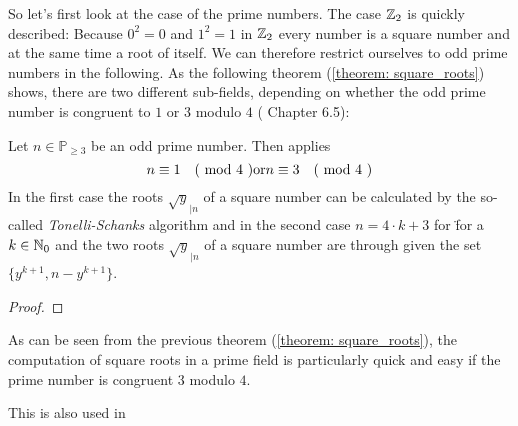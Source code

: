 So let's first look at the case of the prime numbers. The case $ \mathbb{Z}_2 $ is quickly described: Because $ 0^2 = 0 $ and
$ 1 ^ 2 = 1 $ in $ \mathbb{Z}_2 $ every number is a square number and at the same time a root of itself. We can therefore restrict ourselves to odd prime numbers in the following. As the following theorem (\ref{theorem: square_roots}) shows, there are two different sub-fields, depending on whether the odd prime number is congruent to $ 1 $ or $ 3 $ modulo $ 4 $ (\cite{HW} Chapter 6.5):
\begin{theorem} 
\label{theorem: square_roots}
Let $ n \in \mathbb{P}_{\geq 3} $ be an odd prime number. Then applies
$$ n \equiv 1 \quad \text{( mod } 4 \text{ )} \text{or} n \equiv 3 \quad \text{( mod } 4 \text{ )} $$
In the first case the roots $ \sqrt{y}_{| n} $ of a square number can be calculated by the so-called \textit{Tonelli-Schanks} algorithm and in the second case $ n = 4 \cdot k +3 $ for \"for a $ k \in \mathbb{N}_0 $ and the two roots $ \sqrt{y}_{| n} $ of a square number are through
given the set $ \{y ^{k + 1}, n-y ^{k + 1} \} $.
\end{theorem}
\begin{proof}\end{proof}
\begin{remark}
As can be seen from the previous theorem (\ref{theorem: square_roots}), the computation of square roots in a prime field is particularly quick and easy if the prime number is congruent $ 3 $ modulo $ 4 $.

This is also used in 
\end{remark}



